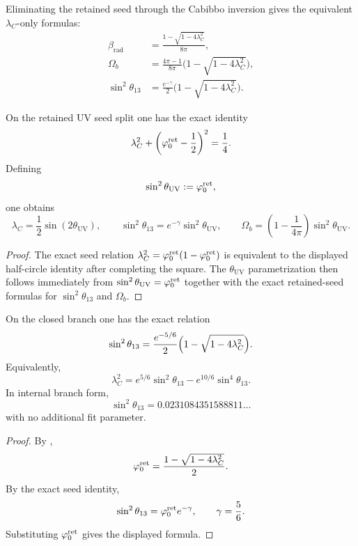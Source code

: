 Eliminating the retained seed through the Cabibbo inversion gives the equivalent
$\lambda_C$-only formulas:
\begin{equation}
\label{eq:lambda-c-master}
\begin{aligned}
\beta_{\mathrm{rad}}&=\frac{1-\sqrt{1-4\lambda_C^2}}{8\pi},\\
\Omega_b&=\frac{4\pi-1}{8\pi}\bigl(1-\sqrt{1-4\lambda_C^2}\bigr),\\
\sin^2\theta_{13}&=\frac{e^{-\gamma}}{2}\bigl(1-\sqrt{1-4\lambda_C^2}\bigr).
\end{aligned}
\end{equation}

\begin{corollary}
\label{cor:uv-half-circle}
On the retained UV seed split one has the exact identity
\[
\lambda_C^2+\left(\varphi_0^{\mathrm{ret}}-\frac12\right)^2=\frac14.
\]
Defining
\[
\sin^2\theta_{\mathrm{UV}}:=\varphi_0^{\mathrm{ret}},
\]
one obtains
\[
\lambda_C=\frac12\sin(2\theta_{\mathrm{UV}}),
\qquad
\sin^2\theta_{13}=e^{-\gamma}\sin^2\theta_{\mathrm{UV}},
\qquad
\Omega_b=\left(1-\frac{1}{4\pi}\right)\sin^2\theta_{\mathrm{UV}}.
\]
\end{corollary}

\begin{proof}
The exact seed relation $\lambda_C^2=\varphi_0^{\mathrm{ret}}(1-\varphi_0^{\mathrm{ret}})$ is equivalent to the displayed half-circle
identity after completing the square. The $\theta_{\mathrm{UV}}$ parametrization then follows
immediately from $\sin^2\theta_{\mathrm{UV}}=\varphi_0^{\mathrm{ret}}$ together with the exact retained-seed formulas
for $\sin^2\theta_{13}$ and $\Omega_b$.
\end{proof}

\begin{corollary}
\label{cor:ckm-pmns-bridge-law}
On the closed branch one has the exact relation
\[
\sin^2\theta_{13}
=
\frac{e^{-5/6}}{2}\Bigl(1-\sqrt{1-4\lambda_C^2}\Bigr).
\]
Equivalently,
\[
\lambda_C^2=e^{5/6}\sin^2\theta_{13}-e^{10/6}\sin^4\theta_{13}.
\]
In internal branch form,
\[
\sin^2\theta_{13}=0.0231084351588811\ldots
\]
with no additional fit parameter.
\end{corollary}

\begin{proof}
By ,
\[
\varphi_0^{\mathrm{ret}}=\frac{1-\sqrt{1-4\lambda_C^2}}{2}.
\]
By the exact seed identity,
\[
\sin^2\theta_{13}=\varphi_0^{\mathrm{ret}} e^{-\gamma},
\qquad
\gamma=\frac56.
\]
Substituting $\varphi_0^{\mathrm{ret}}$ gives the displayed formula.
\end{proof}

